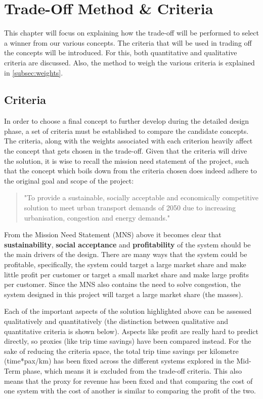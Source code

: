 \newpage
\chapter{Trade-Off Method \& Criteria}
\label{ch4-method}

This chapter will focus on explaining how the trade-off will be performed to select a winner from our various concepts. The criteria that will be used in trading off the concepts will be introduced. For this, both quantitative and qualitative criteria are discussed. Also, the method to weigh the various criteria is explained in \autoref{subsec:weights}. 

\section{Criteria}
\label{sec:Criteria}

In order to choose a final concept to further develop during the detailed design phase, a set of criteria must be established to compare the candidate concepts. The criteria, along with the weights associated with each criterion heavily affect the concept that gets chosen in the trade-off. Given that the criteria will drive the solution, it is wise to recall the mission need statement of the project, such that the concept which boils down from the criteria chosen does indeed adhere to the original goal and scope of the project:

\begin{quote}
    "To provide a sustainable, socially acceptable and economically competitive solution to meet urban transport demands of 2050 due to increasing urbanisation, congestion and energy demands."
\end{quote}

From the Mission Need Statement (MNS) above it becomes clear that \textbf{sustainability}, \textbf{social acceptance} and \textbf{profitability} of the system should be the main drivers of the design. There are many ways that the system could be profitable, specifically, the system could target a large market share and make little profit per customer or target a small market share and make large profits per customer. Since the MNS also contains the need to solve congestion, the system designed in this project will target a large market share (the masses).

Each of the important aspects of the solution highlighted above can be assessed qualitatively and quantitatively (the distinction between qualitative and quantitative criteria is shown below). Aspects like profit are really hard to predict directly, so proxies (like trip time savings) have been compared instead. For the sake of reducing the criteria space, the total trip time savings per kilometre (time*pax/km) has been fixed across the different systems explored in the Mid-Term phase, which means it is excluded from the trade-off criteria. This also means that the proxy for revenue has been fixed and that comparing the cost of one system with the cost of another is similar to comparing the profit of the two.

